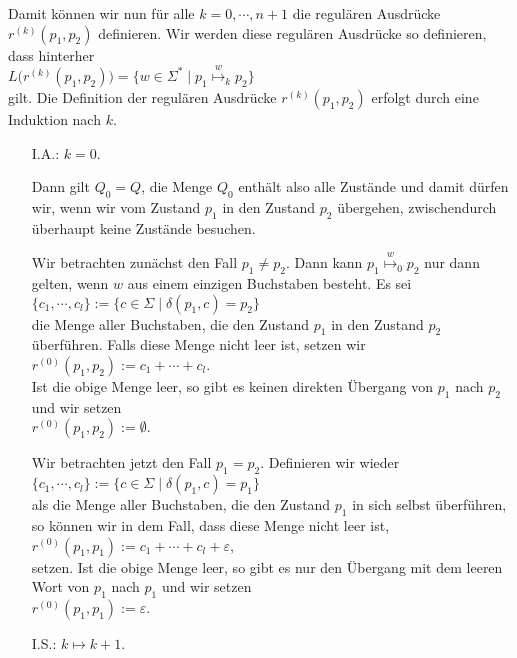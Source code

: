 Damit k\"onnen wir nun f\"ur alle $k=0,\cdots,n+1$ die regul\"aren Ausdr\"ucke
$r^{(k)}(p_1, p_2)$ definieren.  Wir werden diese regul\"aren Ausdr\"ucke so definieren, dass
hinterher
\\[0.2cm]
\hspace*{1.3cm}
$L\bigl(r^{(k)}(p_1, p_2)\bigr) = \bigl\{ w \in \Sigma^* \mid p_1 \stackrel{w}{\mapsto}_k p_2 \bigr\}$
\\[0.2cm]
gilt.
Die Definition der regul\"aren Ausdr\"ucke $r^{(k)}(p_1, p_2)$ erfolgt durch eine Induktion nach $k$.
\begin{enumerate}
\item[I.A.:] $k = 0$.  

  Dann gilt $Q_0 = Q$, die Menge $Q_0$ enth\"alt also alle Zust\"ande
  und damit d\"urfen wir, wenn wir vom Zustand $p_1$ in den Zustand $p_2$ \"ubergehen,
  zwischendurch \"uberhaupt keine Zust\"ande besuchen.

  Wir betrachten zun\"achst den Fall $p_1 \not= p_2$.  Dann kann $p_1 \stackrel{w}{\mapsto}_0 p_2$ nur dann gelten, wenn $w$ aus einem
  einzigen Buchstaben besteht.   Es sei
  \\[0.2cm]
  \hspace*{1.3cm}
  $\{ c_1, \cdots, c_l \} := \{ c \in \Sigma \mid \delta(p_1,c) = p_2 \}$
  \\[0.2cm]
  die Menge aller Buchstaben, die den Zustand $p_1$ in den Zustand $p_2$ \"uberf\"uhren.
  Falls diese Menge nicht leer ist, setzen wir 
  \\[0.2cm]
  \hspace*{1.3cm}
  $r^{(0)}(p_1, p_2) := c_1 + \cdots + c_l$. 
  \\[0.2cm]
  Ist die obige Menge leer, so gibt es keinen direkten \"Ubergang von
  $p_1$ nach $p_2$ und wir setzen 
  \\[0.2cm]
  \hspace*{1.3cm}
  $r^{(0)}(p_1, p_2) := \emptyset$.

  Wir betrachten jetzt den Fall $p_1 = p_2$.  Definieren wir wieder
  \\[0.2cm]
  \hspace*{1.3cm}
  $\{ c_1, \cdots, c_l \} := \{ c \in \Sigma \mid \delta(p_1,c) = p_1 \}$
  \\[0.2cm]
  als die Menge aller Buchstaben, die den Zustand $p_1$ in sich selbst \"uberf\"uhren,
  so k\"onnen wir in dem Fall, dass diese Menge nicht leer ist, 
  \\[0.2cm]
  \hspace*{1.3cm}
  $r^{(0)}(p_1, p_1) := c_1 + \cdots + c_l + \varepsilon$,
  \\[0.2cm]
  setzen.  Ist die obige Menge leer, so gibt es nur den \"Ubergang mit dem leeren Wort
  von $p_1$ nach $p_1$ und wir setzen 
  \\[0.2cm]
  \hspace*{1.3cm}
  $r^{(0)}(p_1, p_1) := \varepsilon$.
\item[I.S.:] $k \mapsto k+1$.  


\end{enumerate}
